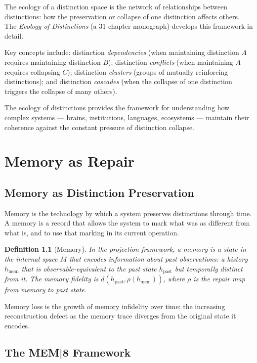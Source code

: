 \documentclass[12pt,a4paper]{book}
\newtheorem{definition}[theorem]{Definition}
\theoremstyle{remark}
\theoremstyle{definition}
\begin{document}
The ecology of a distinction space is the network of relationships
between distinctions: how the preservation or collapse of one distinction
affects others. The \emph{Ecology of Distinctions} (a 31-chapter
monograph) develops this framework in detail.

Key concepts include: distinction \emph{dependencies} (when maintaining
distinction $A$ requires maintaining distinction $B$); distinction
\emph{conflicts} (when maintaining $A$ requires collapsing $C$);
distinction \emph{clusters} (groups of mutually reinforcing distinctions);
and distinction \emph{cascades} (when the collapse of one distinction
triggers the collapse of many others).

The ecology of distinctions provides the framework for understanding
how complex systems --- brains, institutions, languages, ecosystems ---
maintain their coherence against the constant pressure of distinction
collapse.

\chapter{Memory as Repair}

\section{Memory as Distinction Preservation}

Memory is the technology by which a system preserves distinctions through
time. A memory is a record that allows the system to mark what was as
different from what is, and to use that marking in its current operation.

\begin{definition}[Memory]
In the projection framework, a \emph{memory} is a state in the internal
space $M$ that encodes information about past observations: a history
$h_{\text{mem}}$ that is observable-equivalent to the past state
$h_{\text{past}}$ but temporally distinct from it. The \emph{memory
fidelity} is $d(h_{\text{past}}, \rho(h_{\text{mem}}))$, where $\rho$
is the repair map from memory to past state.
\end{definition}

Memory loss is the growth of memory infidelity over time: the increasing
reconstruction defect as the memory trace diverges from the original
state it encodes.

\section{The MEM|8 Framework}
\end{document}
